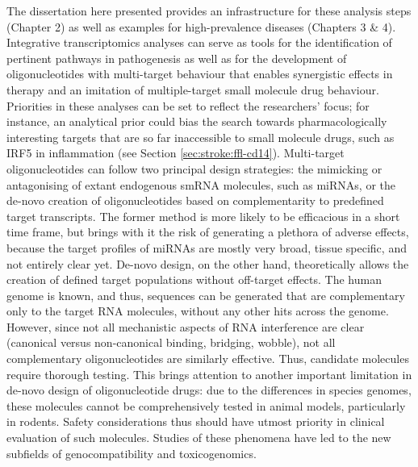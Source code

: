 The dissertation here presented provides an infrastructure for these analysis steps (Chapter 2) as well as examples for high-prevalence diseases (Chapters 3 \& 4). Integrative transcriptomics analyses can serve as tools for the identification of pertinent pathways in pathogenesis as well as for the development of oligonucleotides with multi-target behaviour that enables synergistic effects in therapy and an imitation of multiple-target small molecule drug behaviour. Priorities in these analyses can be set to reflect the researchers' focus; for instance, an analytical prior could bias the search towards pharmacologically interesting targets that are so far inaccessible to small molecule drugs, such as IRF5 in inflammation (see Section \ref{sec:stroke:ffl-cd14}).\cite{Almuttaqi2019} Multi-target oligonucleotides can follow two principal design strategies: the mimicking or antagonising of extant endogenous smRNA molecules, such as miRNAs, or the de-novo creation of oligonucleotides based on complementarity to predefined target transcripts. The former method is more likely to be efficacious in a short time frame, but brings with it the risk of generating a plethora of adverse effects, because the target profiles of miRNAs are mostly very broad, tissue specific, and not entirely clear yet. De-novo design, on the other hand, theoretically allows the creation of defined target populations without off-target effects. The human genome is known, and thus, sequences can be generated that are complementary only to the target RNA molecules, without any other hits across the genome. However, since not all mechanistic aspects of RNA interference are clear (canonical versus non-canonical binding, bridging, wobble), not all complementary oligonucleotides are similarly effective. Thus, candidate molecules require thorough testing. This brings attention to another important limitation in de-novo design of oligonucleotide drugs: due to the differences in species genomes, these molecules cannot be comprehensively tested in animal models, particularly in rodents. Safety considerations thus should have utmost priority in clinical evaluation of such molecules. Studies of these phenomena have led to the new subfields of genocompatibility and toxicogenomics.\cite{Akhtar2007}

